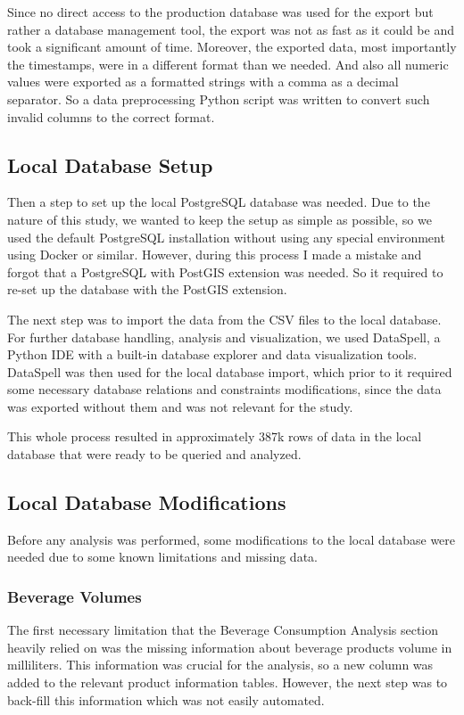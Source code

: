 Since no direct access to the production database was used for the export but rather a database management tool, the export was not as fast as it could be and took a significant amount of time.
Moreover, the exported data, most importantly the timestamps, were in a different format than we needed.
And also all numeric values were exported as a formatted strings with a comma as a decimal separator.
So a data preprocessing Python script was written to convert such invalid columns to the correct format.

\subsection{Local Database Setup}
\label{subsec:data-methodology-local-database-setup}
Then a step to set up the local PostgreSQL database was needed.
Due to the nature of this study, we wanted to keep the setup as simple as possible, so we used the default PostgreSQL installation without using any special environment using Docker or similar.
However, during this process I made a mistake and forgot that a PostgreSQL with PostGIS extension was needed.
So it required to re-set up the database with the PostGIS extension.

The next step was to import the data from the CSV files to the local database.
For further database handling, analysis and visualization, we used DataSpell, a Python IDE with a built-in database explorer and data visualization tools.
DataSpell was then used for the local database import, which prior to it required some necessary database relations and constraints modifications, since the data was exported without them and was not relevant for the study.

This whole process resulted in approximately 387k rows of data in the local database that were ready to be queried and analyzed.

\subsection{Local Database Modifications}
\label{subsec:data-methodology-local-database-modifications}
Before any analysis was performed, some modifications to the local database were needed due to some known limitations and missing data.

\subsubsection{Beverage Volumes}
\label{subsubsec:data-methodology-local-database-modifications-volume}
The first necessary limitation that the Beverage Consumption Analysis section heavily relied on was the missing information about beverage products volume in milliliters.
This information was crucial for the analysis, so a new column was added to the relevant product information tables.
However, the next step was to back-fill this information which was not easily automated.

